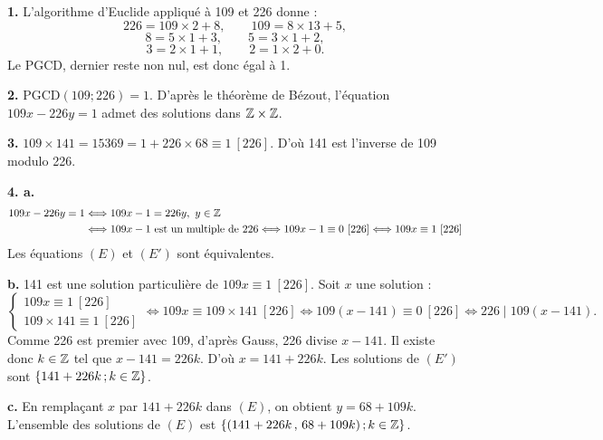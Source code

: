 \documentclass[11pt]{article}
\begin{document}


\textbf{1.} L'algorithme d'Euclide appliqué à 109 et 226 donne :
\[ 226 = 109 \times 2 + 8,\qquad 109 = 8 \times 13 + 5, \]
\[ 8 = 5 \times 1 + 3,\qquad 5 = 3 \times 1 + 2, \]
\[ 3 = 2 \times 1 + 1,\qquad 2 = 1 \times 2 + 0. \]
Le PGCD, dernier reste non nul, est donc égal à 1.

\textbf{2.} $\mathrm{PGCD}(109;226) = 1$. D'après le théorème de Bézout, l'équation $109x - 226y = 1$ admet des solutions dans $\mathbb{Z} \times \mathbb{Z}$.

\textbf{3.} $109 \times 141 = 15369 = 1 + 226 \times 68 \equiv 1\ [226]$. D'où 141 est l'inverse de 109 modulo 226.

\textbf{4. a.}
\begin{align*}
109x - 226y = 1 &\Longleftrightarrow 109x - 1 = 226y,\ y \in \mathbb{Z} \\
&\Longleftrightarrow 109x - 1 \text{ est un multiple de } 226 \Longleftrightarrow 109x - 1 \equiv 0\ [226] \Longleftrightarrow 109x \equiv 1\ [226]
\end{align*}
Les équations $(E)$ et $(E')$ sont équivalentes.

\textbf{b.} 141 est une solution particulière de $109x \equiv 1\ [226]$. Soit $x$ une solution :
\[ \begin{cases} 109x \equiv 1\ [226] \\ 109 \times 141 \equiv 1\ [226] \end{cases} \Longleftrightarrow 109x \equiv 109 \times 141\ [226] \Longleftrightarrow 109(x - 141) \equiv 0\ [226] \Longleftrightarrow 226 \mid 109(x - 141). \]
Comme 226 est premier avec 109, d'après Gauss, 226 divise $x - 141$. Il existe donc $k \in \mathbb{Z}$ tel que $x - 141 = 226k$. D'où $x = 141 + 226k$. Les solutions de $(E')$ sont $\{141 + 226k\,;k \in \mathbb{Z}\}$.

\textbf{c.} En remplaçant $x$ par $141 + 226k$ dans $(E)$, on obtient $y = 68 + 109k$. L'ensemble des solutions de $(E)$ est $\{(141 + 226k\,,\,68 + 109k)\,;k \in \mathbb{Z}\}$.

\end{document}

